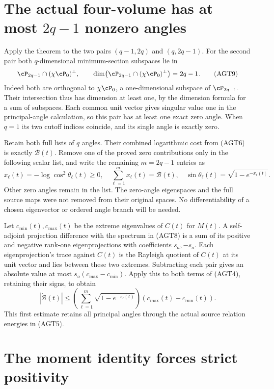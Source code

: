 \section{The actual four-volume has at most \texorpdfstring{$2q-1$}{2q-1} nonzero angles}

Apply the theorem to the two pairs $(q-1,2q)$ and $(q,2q-1)$.
For the second pair both $q$-dimensional minimum-section
subspaces lie in
\[
 \cP_{2q-1}\cap(\chi\cP_0)^\perp,
 \qquad\dim\bigl(\cP_{2q-1}\cap(\chi\cP_0)^\perp\bigr)=2q-1.
 \tag{AGT9}
\]
Indeed both are orthogonal to $\chi\cP_0$, a one-dimensional
subspace of $\cP_{2q-1}$. Their intersection thus has dimension
at least one, by the dimension formula for a sum of subspaces.
Each common unit vector gives singular value one in the
principal-angle calculation, so this pair has at least one
exact zero angle. When $q=1$ its two cutoff indices coincide,
and its single angle is exactly zero.

Retain both full lists of $q$ angles. Their combined logarithmic
cost from (AGT6) is exactly $\mathcal B(t)$. Remove one of the
proved zero contributions only in the following scalar list,
and write the remaining $m=2q-1$ entries as
\[
 x_\ell(t)=-\log\cos^2\theta_\ell(t)\ge0,
 \quad\sum_{\ell=1}^{m}x_\ell(t)=\mathcal B(t),
 \quad\sin\theta_\ell(t)=\sqrt{1-e^{-x_\ell(t)}}.
 \tag{AGT10}
\]
Other zero angles remain in the list. The zero-angle eigenspaces
and the full source maps were not removed from their original
spaces. No differentiability of a chosen eigenvector or ordered
angle branch will be needed.

Let $c_{\min}(t),c_{\max}(t)$ be the extreme eigenvalues of
$C(t)$ for $M(t)$. A self-adjoint projection difference with
the spectrum in (AGT8) is a sum of its positive and negative
rank-one eigenprojections with coefficients $s_a,-s_a$.
Each eigenprojection's trace against $C(t)$ is the Rayleigh
quotient of $C(t)$ at its unit vector and lies between these
two extremes. Subtracting each pair gives an absolute value
at most $s_a(c_{\max}-c_{\min})$. Apply this to both terms
of (AGT4), retaining their signs, to obtain
\[
 |\dot{\mathcal B}(t)|
 \le\left(\sum_{\ell=1}^{m}\sqrt{1-e^{-x_\ell(t)}}\right)
                       (c_{\max}(t)-c_{\min}(t)).
 \tag{AGT11}
\]
This first estimate retains all principal angles through the
actual source relation energies in (AGT5).

\section{The moment identity forces strict positivity}

